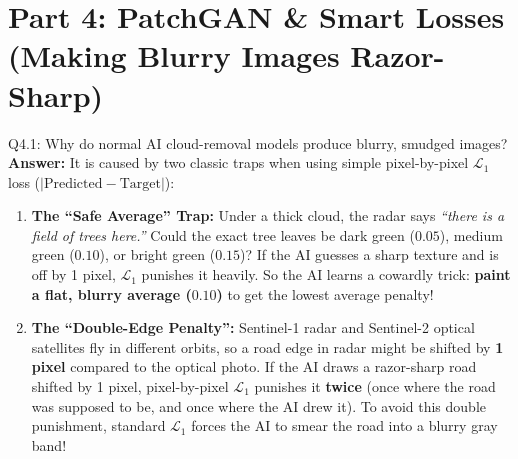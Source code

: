 \documentclass[11pt,a4paper]{article}
\begin{document}
\newpage

\section{Part 4: PatchGAN \& Smart Losses (Making Blurry Images Razor-Sharp)}

\begin{qbox}{Q4.1: Why do normal AI cloud-removal models produce blurry, smudged images?}
\textbf{Answer:}
It is caused by two classic traps when using simple pixel-by-pixel $\mathcal{L}_1$ loss ($|\text{Predicted} - \text{Target}|$):
\begin{enumerate}[leftmargin=18pt]
    \item \textbf{The ``Safe Average'' Trap:} Under a thick cloud, the radar says \textit{``there is a field of trees here.''} Could the exact tree leaves be dark green ($0.05$), medium green ($0.10$), or bright green ($0.15$)? If the AI guesses a sharp texture and is off by 1 pixel, $\mathcal{L}_1$ punishes it heavily. So the AI learns a cowardly trick: \textbf{paint a flat, blurry average ($0.10$)} to get the lowest average penalty!
    \item \textbf{The ``Double-Edge Penalty'':} Sentinel-1 radar and Sentinel-2 optical satellites fly in different orbits, so a road edge in radar might be shifted by \textbf{1 pixel} compared to the optical photo. If the AI draws a razor-sharp road shifted by 1 pixel, pixel-by-pixel $\mathcal{L}_1$ punishes it \textbf{twice} (once where the road was supposed to be, and once where the AI drew it). To avoid this double punishment, standard $\mathcal{L}_1$ forces the AI to smear the road into a blurry gray band!
\end{enumerate}
\end{qbox}
\end{document}
